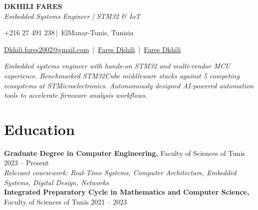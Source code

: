 \documentclass[a4paper,10pt]{article}
\newcommand{\socialicon}[1]{\raisebox{-0.05em}{\resizebox{!}{1em}{#1}}}
\newcommand{\headerfontiii}{\fontfamily{ppl}\selectfont} %
\begin{document}
\headerfontiii

\begin{center}
    {\Huge\textbf{DKHILI FARES}}\\[2mm]
    {\large\textit{Embedded Systems Engineer | STM32 \& IoT}}
\end{center}
\vspace{-4mm}

\begin{center}
    \small{
    +216 27 491 238\,|\ ElManar-Tunis, Tunisia
    }
\end{center}
\vspace{-6mm}
\vspace{2.2mm}
\begin{center}
    \small{
    \href{mailto:Dkhili.fares2002@gmail.com}{Dkhili.fares2002@gmail.com} \,|\,
    \socialicon{\faLinkedin}
    \href{https://www.linkedin.com/in/fares-dkhili-018b17303/}{Fares Dkhili} \,|\,
    \socialicon{\faGithub}
    \href{https://github.com/DkhiliFares}{Fares Dkhili}
    }
\end{center}
\vspace{-2mm}
\begin{center}
\small{\textit{Embedded systems engineer with hands-on STM32 and multi-vendor MCU experience. Benchmarked STM32Cube middleware stacks against 5 competing ecosystems at STMicroelectronics. Autonomously designed AI-powered automation tools to accelerate firmware analysis workflows.}}
\end{center}


\section{\textbf{Education}}
\noindent
\textbf{Graduate Degree in Computer Engineering,} Faculty of Sciences of Tunis \hfill 2023 -- Present\\
\textit{\footnotesize{Relevant coursework: Real-Time Systems, Computer Architecture, Embedded Systems, Digital Design, Networks}}\\
\textbf{Integrated Preparatory Cycle in Mathematics and Computer Science,} Faculty of Sciences of Tunis \hfill 2021 -- 2023
\end{document}
